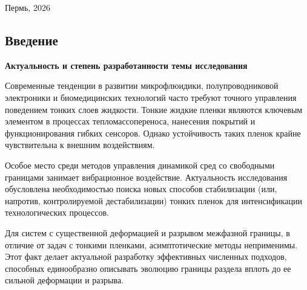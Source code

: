 \documentclass[12pt,a4paper]{article}
\begin{document}
\vspace{3em}

\begin{center}
	\small Пермь, 2026
\end{center}



\pagestyle{empty}
\makeatletter
\renewcommand{\@oddhead}{\hfil \thepage\hfil}
\makeatother

\newpage


\renewcommand{\contentsname}{\center{Оглавление}} 	%
\tableofcontents
\newpage
\begin{center}
	\section*{Введение} %
\end{center}

\textbf{Актуальность и степень разработанности темы исследования}

Современные тенденции в развитии микрофлюидики, полупроводниковой электроники и биомедицинских технологий часто требуют точного управления поведением тонких слоев жидкости. Тонкие жидкие пленки являются ключевым элементом в процессах тепломассопереноса, нанесения покрытий и функционирования гибких сенсоров. Однако устойчивость таких пленок крайне чувствительна к внешним воздействиям.

Особое место среди методов управления динамикой сред со свободными границами занимает вибрационное воздействие. Актуальность исследования обусловлена необходимостью поиска новых способов стабилизации (или, напротив, контролируемой дестабилизации) тонких пленок для интенсификации технологических процессов. 

Для систем с существенной деформацией и разрывом межфазной границы, в отличие от задач с тонкими пленками, асимптотические методы неприменимы. Этот факт делает актуальной разработку эффективных численных подходов, способных единообразно описывать эволюцию границы раздела вплоть до ее сильной деформации и разрыва.
\end{document}
